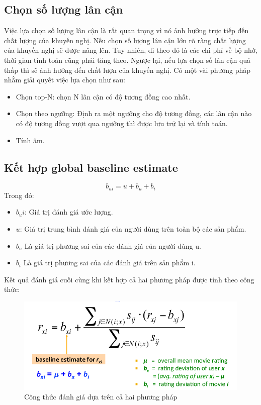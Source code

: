 \documentclass{report}
\begin{document}
	\subsection{Chọn số lượng lân cận}
	Việc lựa chọn số lượng lân cận là rất quan trọng vì nó ảnh hưởng trực tiếp đến chất
	lượng của khuyến nghị. Nếu chọn số lượng lân cận lớn rõ ràng chất
	lượng của khuyến nghị sẽ được nâng lên. Tuy nhiên, đi theo đó là các chi
	phí về bộ nhớ, thời gian tính toán cũng phải tăng theo. Ngược lại, nếu
	lựa chọn số lân cận quá thấp thì sẽ ảnh hưởng đến chất lượn của khuyến
	nghị. Có một vài phương pháp nhằm giải quyết việc lựa chọn như sau:
	\begin{itemize}
		\item Chọn top-N: chọn N lân cận có độ tương đồng cao nhất.
		\item Chọn theo ngưỡng: Định ra một ngưỡng cho độ tương đồng, các lân cận nào có độ tương dồng vượt qua ngưỡng thì được lưu trữ lại và tính toán.
		\item Tính âm.
		\end{itemize}
	
	\subsection{Kết hợp global baseline estimate}
		$$b_{ui} = u + b_u + b_i$$
		Trong đó:
		\begin{itemize}
			\item $b_ui$: Giá trị đánh giá ước lượng.
			\item $u$: Giá trị trung bình đánh giá của người dùng trên toàn bộ các sản phẩm.
			\item $b_u$ Là giá trị phương sai của các đánh giá của người dùng u.
			\item $b_i$ Là giá trị phương sai của các đánh giá trên sản phẩm i.
		\end{itemize}
		
		Kết quả đánh giá cuối cùng khi kết hợp cả hai phương pháp được tính theo công thức:
		\begin{figure}
			\centering
			\includegraphics[scale=0.5]{img/pic9.png}
			\caption{Công thức đánh giá dựa trên cả hai phương pháp}
		\end{figure}
		
\end{document}
